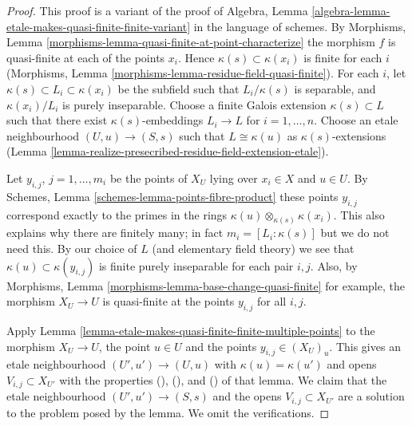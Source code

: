 \begin{proof}
This proof is a variant of the proof of
Algebra, Lemma \ref{algebra-lemma-etale-makes-quasi-finite-finite-variant}
in the language of schemes.
By Morphisms, Lemma \ref{morphisms-lemma-quasi-finite-at-point-characterize}
the morphism $f$ is quasi-finite at each of the points $x_i$.
Hence $\kappa(s) \subset \kappa(x_i)$ is finite for each $i$
(Morphisms, Lemma \ref{morphisms-lemma-residue-field-quasi-finite}).
For each $i$, let $\kappa(s) \subset L_i \subset \kappa(x_i)$
be the subfield such that $L_i/\kappa(s)$ is separable, and
$\kappa(x_i)/L_i$ is purely inseparable. Choose a finite Galois
extension $\kappa(s) \subset L$ such that there exist
$\kappa(s)$-embeddings $L_i \to L$ for $i = 1, \ldots, n$.
Choose an etale neighbourhood $(U, u) \to (S, s)$ such that
$L \cong \kappa(u)$ as $\kappa(s)$-extensions
(Lemma \ref{lemma-realize-presecribed-residue-field-extension-etale}).

\medskip\noindent
Let $y_{i, j}$, $j = 1, \ldots, m_i$ be the points of $X_U$
lying over $x_i \in X$ and $u \in U$. By
Schemes, Lemma \ref{schemes-lemma-points-fibre-product}
these points $y_{i, j}$ correspond exactly to the primes in the rings
$\kappa(u) \otimes_{\kappa(s)} \kappa(x_i)$. This also
explains why there are finitely many; in fact
$m_i = [L_i : \kappa(s)]$ but we do not need this.
By our choice of
$L$ (and elementary field theory)
we see that $\kappa(u) \subset \kappa(y_{i, j})$ is
finite purely inseparable for each pair $i, j$.
Also, by Morphisms, Lemma \ref{morphisms-lemma-base-change-quasi-finite}
for example, the morphism
$X_U \to U$ is quasi-finite at the points $y_{i, j}$ for
all $i, j$.

\medskip\noindent
Apply Lemma \ref{lemma-etale-makes-quasi-finite-finite-multiple-points}
to the morphism $X_U \to U$, the point $u \in U$
and the points $y_{i, j} \in (X_U)_u$. This gives an etale neighbourhood
$(U', u') \to (U, u)$ with $\kappa(u) = \kappa(u')$ and
opens $V_{i, j} \subset X_{U'}$ with the properties
(), (), and ()
of that lemma. We claim that the etale neighbourhood
$(U', u') \to (S, s)$ and the opens $V_{i, j} \subset X_{U'}$
are a solution to the problem posed by the lemma.
We omit the verifications.
\end{proof}

